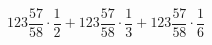 \begin{ex}[type=calculate_rational]
	\begin{condition}
		\( 123\dfrac{57}{58}\cdot\dfrac{1}{2}+123\dfrac{57}{58}\cdot\dfrac{1}{3}+123\dfrac{57}{58}\cdot\dfrac{1}{6} \)
	\end{condition}
	\answer{}
\end{ex}